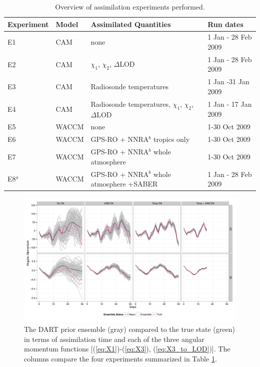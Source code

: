 \begin{table}
\caption{Overview of assimilation experiments performed.}
\centering
\begin{tabular}{p{2cm}p{2cm}p{6cm}p{4cm}}
	Experiment& Model &  Assimilated Quantities  & Run dates \\
\hline
E1 & CAM	&	none &  1 Jan - 28 Feb 2009 \\
E2 & CAM &	$\chi_1$, $\chi_2$, $\Delta$LOD	& 1 Jan - 28 Feb 2009 \\
E3 & CAM &	Radiosonde temperatures	& 1 Jan -31 Jan 2009	\\
E4 & CAM &	Radiosonde temperatures, $\chi_1$, $\chi_2$, $\Delta$LOD	& 1 Jan - 17 Jan 2009\\
E5 & WACCM &	none   & 1-30 Oct 2009	\\
E6 & WACCM &	GPS-RO + NNRA$^b$ tropics only & 1-30 Oct 2009	\\
E7 & WACCM &	GPS-RO + NNRA$^b$ whole atmosphere  & 1-30 Oct 2009	\\
E8$^a$ & WACCM &	GPS-RO + NNRA$^b$ whole atmosphere +SABER & 1 Jan - 28 Feb 2009\\	
\hline
\end{tabular}
\label{tab:expts}
\end{table}
\clearpage


\begin{figure}[p]
\includegraphics[width=\textwidth]{Paper_figures/ERPDA_paper_erpda_obs_space.pdf} 
 \caption{ The DART prior ensemble (gray) compared to the true state (green) in terms of assimilation time and each of the three angular momentum functions [(\ref{eq:X1})-(\ref{eq:X3}), (\ref{eq:X3_to_LOD})].  The columns compare the four experiments summarized in Table \ref{tab:expts}.  }
 \label{fig:fit_to_ERPs}
\end{figure}

